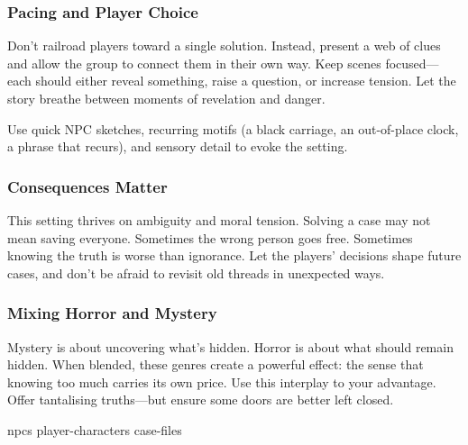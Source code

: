 \subsubsection*{Pacing and Player Choice}

Don’t railroad players toward a single solution. Instead, present a web of clues and allow the group to connect them in their own way. Keep scenes focused—each should either reveal something, raise a question, or increase tension. Let the story breathe between moments of revelation and danger.

Use quick NPC sketches, recurring motifs (a black carriage, an out-of-place clock, a phrase that recurs), and sensory detail to evoke the setting.

\subsubsection*{Consequences Matter}

This setting thrives on ambiguity and moral tension. Solving a case may not mean saving everyone. Sometimes the wrong person goes free. Sometimes knowing the truth is worse than ignorance. Let the players’ decisions shape future cases, and don’t be afraid to revisit old threads in unexpected ways.

\subsubsection*{Mixing Horror and Mystery}

Mystery is about uncovering what’s hidden. Horror is about what should remain hidden. When blended, these genres create a powerful effect: the sense that knowing too much carries its own price. Use this interplay to your advantage. Offer tantalising truths—but ensure some doors are better left closed.


{npcs}
{player-characters}
{case-files}